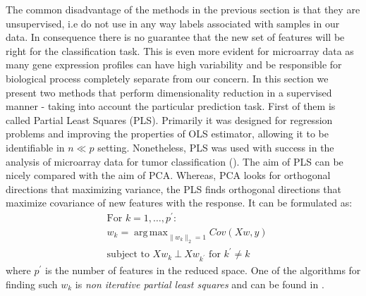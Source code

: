 \documentclass[shortabstract, english, mgr]{iithesis}
\DeclareMathOperator*{\argmax}{arg\,max}
\begin{document}
The common disadvantage of the methods in the previous section is that they are unsupervised, i.e do not use in any way labels associated with samples in our data. In consequence there is no guarantee that the new set of features will be right for the classification task. This is even more evident for microarray data as many gene expression profiles can have high variability and be responsible for biological process completely separate from our concern. In this section we present two methods that perform dimensionality reduction in a supervised manner - taking into account the particular prediction task. First of them is called Partial Least Squares (PLS). Primarily it was designed for regression problems and improving the properties of OLS estimator, allowing it to be identifiable in $n \ll p$ setting. Nonetheless, PLS was used with success in the analysis of microarray data for tumor classification (\cite{TumorPLS}). The aim of PLS can be nicely compared with the aim of PCA. Whereas, PCA looks for orthogonal directions that maximizing variance, the PLS finds orthogonal directions that maximize covariance of new features with the response. It can be formulated as:
\begin{align*}
& \text{For $k=1, \ldots, p^{\prime}$}: \\
& w_k = \argmax_{\|w_k\|_2 = 1} Cov \left(Xw,y\right) \\
&\text{subject to } Xw_k \ \bot \  Xw_{k^{\prime}} \text{ for } k^{\prime} \neq k  
\end{align*}
where $p^{\prime}$ is the number of features in the reduced space. One of the algorithms for finding such $w_k$ is \textit{non iterative partial least squares} and can be found in \cite[chapter 3.5.2]{ESL2}. 
\end{document}
